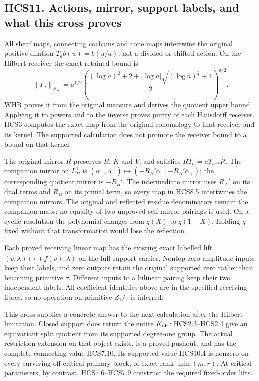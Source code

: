 \subsection{HCS11. Actions, mirror, support labels, and what this cross
proves}\label{hcs11.-actions-mirror-support-labels-and-what-this-cross-proves}

All sheaf maps, connecting cochains and cone maps intertwine the
original positive dilation \(T_ab(u)=b(u/a)\), not a divided or shifted
action. On the Hilbert receiver the exact retained bound is \[
\|T_a\|_{\mathcal H_\delta}
=a^{1/2}
\left(\frac{(\log a)^2+2+
|\log a|\sqrt{(\log a)^2+4}}2\right)^{\delta/2}.
\tag{HCS11.1}
\] WHR proves it from the original measure and derives the quotient
upper bound. Applying it to powers and to the inverse proves purity of
each Hausdorff receiver. HCS3 computes the exact map from the original
cohomology to that receiver and its kernel. The supported calculation
does not promote the receiver bound to a bound on that kernel.

The original mirror \(R\) preserves \(B\), \(K\) and \(V\), and
satisfies \(RT_a=aT_{a^{-1}}R\). The companion mirror on \(L_B^1\) is
\((\alpha_+,\alpha_-)\mapsto(-R_B'\alpha_-,-R_B'\alpha_+)\); the
corresponding quotient mirror is \(-R_B'\). The intermediate mirror uses
\(R_A'\) on its dual terms and \(R_B\) on its primal term, so every map
in HCS8.5 intertwines the companion mirrors. The original and reflected
residue denominators remain the companion maps; no equality of two
unproved self-mirror pairings is used. On a cyclic resolution the
polynomial changes from \(q(X)\) to \(q(1-X)\). Holding \(q\) fixed
without that transformation would lose the reflection.

Each proved receiving linear map has the existing exact labelled lift
\((v,\lambda)\mapsto(f(v),\lambda)\) on the full support carrier. Nontop
zero-amplitude inputs keep their labels, and zero outputs retain the
original supported zero rather than becoming primitive \(\tau\).
Different inputs to a bilinear pairing keep their two independent
labels. All coefficient identities above are in the specified receiving
fibres, so no operation on primitive \(Z_1/\tau\) is inferred.

This cross supplies a concrete answer to the next calculation after the
Hilbert limitation. Closed support does return the entire
\(K_{\rm off}\): HCS2.3--HCS2.4 give an equivariant split quotient from
its supported degree-one group. The actual restriction extension on that
object exists, is a proved pushout, and has the complete connecting
value HCS7.10. Its supported value HCS10.4 is nonzero on every surviving
off-critical primary block, of exact rank \(\min(m,r)\). At critical
parameters, by contrast, HCS7.6--HCS7.9 construct the required
fixed-order lifts.

